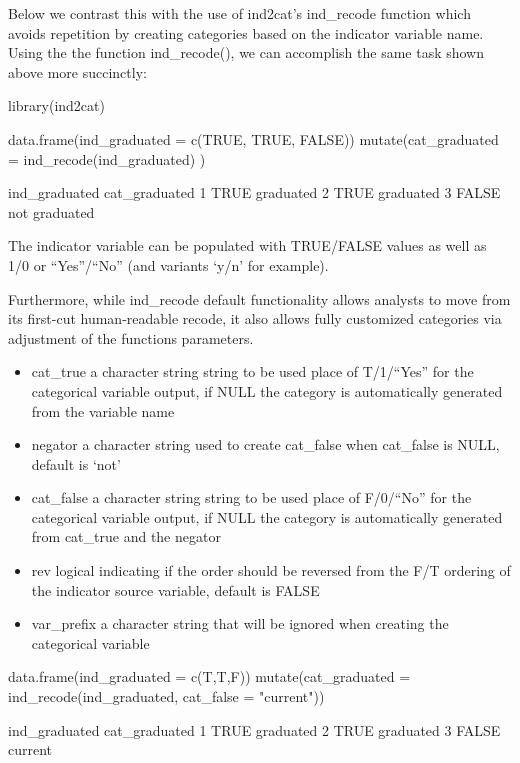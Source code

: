 Below we contrast this with the use of ind2cat's ind\_recode function
which avoids repetition by creating categories based on the indicator
variable name. Using the the function ind\_recode(), we can accomplish
the same task shown above more succinctly:

\begin{Schunk}
\begin{Sinput}
library(ind2cat)

data.frame(ind_graduated = 
             c(TRUE, TRUE, FALSE)) %
  mutate(cat_graduated  = 
           ind_recode(ind_graduated)
         )
\end{Sinput}
\begin{Soutput}
       ind_graduated cat_graduated
     1          TRUE     graduated
     2          TRUE     graduated
     3         FALSE not graduated
\end{Soutput}
\end{Schunk}

The indicator variable can be populated with TRUE/FALSE values as well
as 1/0 or ``Yes''/``No'' (and variants `y/n' for example).

Furthermore, while ind\_recode default functionality allows analysts to
move from its first-cut human-readable recode, it also allows fully
customized categories via adjustment of the functions parameters.

\begin{itemize}
\item
  cat\_true a character string string to be used place of T/1/``Yes''
  for the categorical variable output, if NULL the category is
  automatically generated from the variable name
\item
  negator a character string used to create cat\_false when cat\_false
  is NULL, default is `not'
\item
  cat\_false a character string string to be used place of F/0/``No''
  for the categorical variable output, if NULL the category is
  automatically generated from cat\_true and the negator
\item
  rev logical indicating if the order should be reversed from the F/T
  ordering of the indicator source variable, default is FALSE
\item
  var\_prefix a character string that will be ignored when creating the
  categorical variable
\end{itemize}

\begin{Schunk}
\begin{Sinput}
data.frame(ind_graduated = c(T,T,F)) %
  mutate(cat_graduated  = ind_recode(ind_graduated, 
                                     cat_false = "current"))
\end{Sinput}
\begin{Soutput}
       ind_graduated cat_graduated
     1          TRUE     graduated
     2          TRUE     graduated
     3         FALSE       current
\end{Soutput}
\end{Schunk}

